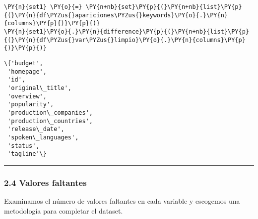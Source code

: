     \begin{tcolorbox}[breakable, size=fbox, boxrule=1pt, pad at break*=1mm,colback=cellbackground, colframe=cellborder]
\begin{Verbatim}[commandchars=\\\{\}]
\PY{n}{set1} \PY{o}{=} \PY{n+nb}{set}\PY{p}{(}\PY{n+nb}{list}\PY{p}{(}\PY{n}{df\PYZus{}apariciones\PYZus{}keywords}\PY{o}{.}\PY{n}{columns}\PY{p}{)}\PY{p}{)}
\PY{n}{set1}\PY{o}{.}\PY{n}{difference}\PY{p}{(}\PY{n+nb}{list}\PY{p}{(}\PY{n}{df\PYZus{}var\PYZus{}limpio}\PY{o}{.}\PY{n}{columns}\PY{p}{)}\PY{p}{)}
\end{Verbatim}
\end{tcolorbox}

            \begin{tcolorbox}[breakable, size=fbox, boxrule=.5pt, pad at break*=1mm, opacityfill=0]
\begin{Verbatim}[commandchars=\\\{\}]
\{'budget',
 'homepage',
 'id',
 'original\_title',
 'overview',
 'popularity',
 'production\_companies',
 'production\_countries',
 'release\_date',
 'spoken\_languages',
 'status',
 'tagline'\}
\end{Verbatim}
\end{tcolorbox}
        
    \begin{center}\rule{0.5\linewidth}{0.5pt}\end{center}

\hypertarget{valores-faltantes}{%
\subsubsection{2.4 Valores faltantes}\label{valores-faltantes}}

Examinamos el número de valores faltantes en cada variable y escogemos
una metodología para completar el dataset.

